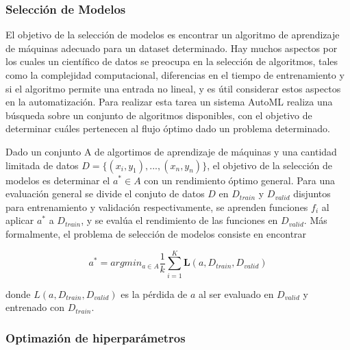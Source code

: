 \subsubsection{Selección de Modelos}

El objetivo de la selección de modelos es encontrar un algoritmo de aprendizaje de máquinas adecuado para un dataset determinado. Hay muchos aspectos por los cuales un científico de datos se preocupa en la selección de algoritmos, tales como la complejidad computacional, diferencias en el tiempo de entrenamiento y si el algoritmo permite una entrada no lineal, y es útil considerar estos aspectos en la automatización. Para realizar esta tarea un sistema AutoML realiza una búsqueda sobre un conjunto de algoritmos disponibles, con el objetivo de determinar cuáles pertenecen al flujo óptimo dado un problema determinado.

\begin{definition}
	Dado un conjunto A de algortimos de aprendizaje de máquinas y una cantidad limitada de datos $D = \{(x_i, y_1),..., (x_n, y_n)\}$, el objetivo de la selección de modelos es determinar el $a^* \in A$ con un rendimiento óptimo general. Para una evaluación general se divide el conjuto de datos $D$ en $D_{train}$ y $D_{valid}$ disjuntos para entrenamiento y validación respectivamente, se aprenden funciones $f_i$ al aplicar $a^*$ a $D_{train}$, y se evalúa el rendimiento de las funciones en $D_{valid}$. Más formalmente, el problema de selección de modelos consiste en encontrar

	\begin{equation}
		a^* = argmin_{a \in A}\dfrac{1}{k}\sum_{i=1}^K \textbf{L}(a, D_{train}, D_{valid})
	\end{equation}
	
	donde $L(a, D_{train}, D_{valid})$ es la pérdida de $a$ al ser evaluado en $D_{valid}$ y entrenado con $D_{train}$.
	

\end{definition}

\subsubsection{Optimazión de hiperparámetros}

